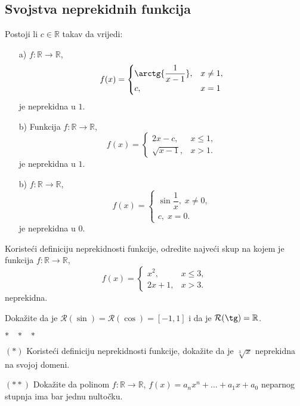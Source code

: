 \subsection*{Svojstva neprekidnih funkcija}
\begin{exercise}
Postoji li $c\in \mathbb{R}$ takav da vrijedi:
\begin{itemize}
\item[a)] $f : \mathbb{R}\to \mathbb{R}$, $$f(x)=\begin{cases}
\arctg{\dfrac{1}{x-1}},& x\neq 1,\\
c, & x=1
\end{cases}$$ 
je neprekidna u $1$.
\item[b)] Funkcija $f : \mathbb{R}\to \mathbb{R}$, $$f(x)=\begin{cases}
2x-c,& x\leq 1,\\
\sqrt{x-1},& x>1.
\end{cases}$$
je neprekidna u $1$.
\item[b)] $f : \mathbb{R}\to \mathbb{R}$, $$f(x)=\begin{cases}
\sin{\dfrac{1}{x}},\; x\neq 0,\\
c,\; x=0.
\end{cases}$$
je neprekidna u $0$.
\end{itemize}
\end{exercise}
\begin{exercise}
Koristeći definiciju neprekidnosti funkcije, odredite najveći skup na kojem je funkcija $f : \mathbb{R}\to \mathbb{R}$,
$$f(x)=\begin{cases}
x^2,& x\leq 3,\\
2x+1,& x>3.
\end{cases}$$
neprekidna.
\end{exercise}
\begin{exercise}
Dokažite da je $\mathcal{R}(\sin)=\mathcal{R}(\cos)=[-1, 1]$ i da je $\mathcal{R}(\tg)=\mathbb{R}$.
\end{exercise}
\begin{center}
$*\hspace{0.3cm}*\hspace{0.3cm}*\hspace{0.3cm}$
\end{center}
\begin{exercise} $(*)$
Koristeći definiciju neprekidnosti funkcije, dokažite da je $\sqrt[3]{x}$ neprekidna na svojoj domeni.
\end{exercise}
\begin{exercise} $(**)$
Dokažite da polinom $f : \mathbb{R}\to \mathbb{R}$, $f(x)=a_nx^n+\dots+a_1x+a_0$ neparnog stupnja ima bar jednu nultočku.
\end{exercise}
